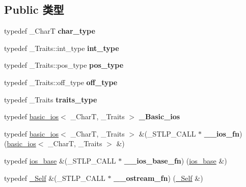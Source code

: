 \subsection*{Public 类型}
\begin{DoxyCompactItemize}
\item 
\mbox{\label{classbasic__ostream_ab4d70cdc754310b82bcb085fdf719ff3}} 
typedef \+\_\+\+CharT {\bfseries char\+\_\+type}
\item 
\mbox{\label{classbasic__ostream_a6d6d87fd8f48bc1933c5d105028e4bc7}} 
typedef \+\_\+\+Traits\+::int\+\_\+type {\bfseries int\+\_\+type}
\item 
\mbox{\label{classbasic__ostream_ac06ecb3d5fc9b654a870299cb9a97e01}} 
typedef \+\_\+\+Traits\+::pos\+\_\+type {\bfseries pos\+\_\+type}
\item 
\mbox{\label{classbasic__ostream_ae9bab58166653e5a80ff29c5e3ee7c06}} 
typedef \+\_\+\+Traits\+::off\+\_\+type {\bfseries off\+\_\+type}
\item 
\mbox{\label{classbasic__ostream_a4b5fe7e82a9799b64ff82967e69e3364}} 
typedef \+\_\+\+Traits {\bfseries traits\+\_\+type}
\item 
\mbox{\label{classbasic__ostream_ac7ee5e64a8aed20d3628bd824077367a}} 
typedef \hyperlink{classbasic__ios}{basic\+\_\+ios}$<$ \+\_\+\+CharT, \+\_\+\+Traits $>$ {\bfseries \+\_\+\+Basic\+\_\+ios}
\item 
\mbox{\label{classbasic__ostream_a41a16c7c18f6330ab29cf16e009fc70f}} 
typedef \hyperlink{classbasic__ios}{basic\+\_\+ios}$<$ \+\_\+\+CharT, \+\_\+\+Traits $>$ \&(\+\_\+\+S\+T\+L\+P\+\_\+\+C\+A\+LL $\ast$ {\bfseries \+\_\+\+\_\+ios\+\_\+fn}) (\hyperlink{classbasic__ios}{basic\+\_\+ios}$<$ \+\_\+\+CharT, \+\_\+\+Traits $>$ \&)
\item 
\mbox{\label{classbasic__ostream_a4172a61568c81225369826c2a55224db}} 
typedef \hyperlink{classios__base}{ios\+\_\+base} \&(\+\_\+\+S\+T\+L\+P\+\_\+\+C\+A\+LL $\ast$ {\bfseries \+\_\+\+\_\+ios\+\_\+base\+\_\+fn}) (\hyperlink{classios__base}{ios\+\_\+base} \&)
\item 
\mbox{\label{classbasic__ostream_a1ae0d93e4fbb0a192e6e902290e06e32}} 
typedef \hyperlink{classbasic__ostream}{\+\_\+\+Self} \&(\+\_\+\+S\+T\+L\+P\+\_\+\+C\+A\+LL $\ast$ {\bfseries \+\_\+\+\_\+ostream\+\_\+fn}) (\hyperlink{classbasic__ostream}{\+\_\+\+Self} \&)
\end{DoxyCompactItemize}
